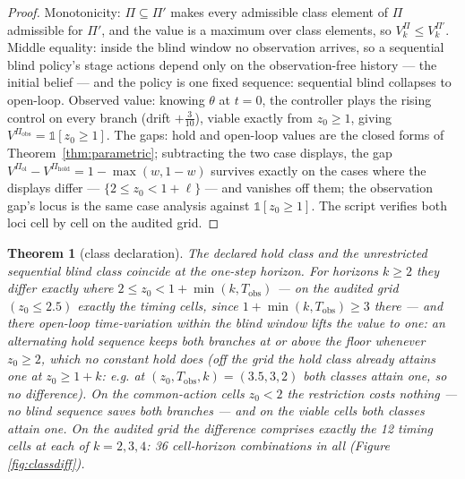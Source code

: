 \documentclass[10pt,twocolumn]{article}
\theoremstyle{plain}
\newtheorem{theorem}{Theorem}
\theoremstyle{definition}
\theoremstyle{remark}
\begin{document}
\begin{proof}
Monotonicity: \(\Pi \subseteq \Pi'\) makes every admissible class
element of \(\Pi\) admissible for \(\Pi'\), and the value is a
maximum over class elements, so
\(V^{\Pi}_{k} \le V^{\Pi'}_{k}\). Middle equality: inside the blind
window no observation arrives, so a sequential blind policy's stage
actions depend only on the observation-free history --- the initial
belief --- and the policy is one fixed sequence: sequential blind
collapses to open-loop. Observed value: knowing \(\theta\) at
\(t = 0\), the controller plays the rising control on every branch
(drift \(+\tfrac3{10}\)), viable exactly from \(z_{0} \ge 1\),
giving \(V^{\Pi_{\mathrm{obs}}} = \mathbb{1}[z_{0} \ge 1]\). The
gaps: hold and open-loop values are the closed forms of
Theorem~\ref{thm:parametric}; subtracting the two case displays, the gap
\(V^{\Pi_{\mathrm{ol}}} - V^{\Pi_{\mathrm{hold}}} = 1 - \max(w,
1 - w)\) survives exactly on the cases where the displays differ ---
\(\{2 \le z_{0} < 1 + \ell\}\) --- and vanishes off them; the
observation gap's locus is the same case analysis against
\(\mathbb{1}[z_{0} \ge 1]\). The script verifies both loci cell by
cell on the audited grid.
\end{proof}

\begin{theorem}[class declaration]\label{thm:class}
The declared hold class and the unrestricted sequential blind class
coincide at the one-step horizon. For horizons \(k \ge 2\) they differ
exactly where \(2 \le z_{0} < 1 + \min(k, T_{\mathrm{obs}})\) --- on
the audited grid \((z_{0} \le 2.5)\) exactly the timing cells, since
\(1 + \min(k, T_{\mathrm{obs}}) \ge 3\) there --- and there open-loop
time-variation within the blind window lifts the value to one: an
alternating hold sequence keeps both branches at or above the floor
whenever \(z_{0} \ge 2\), which no constant hold does (off the grid
the hold class already attains one at \(z_{0} \ge 1 + k\): e.g. at
\((z_{0}, T_{\mathrm{obs}}, k) = (3.5, 3, 2)\) both classes attain
one, so no difference). On the
common-action cells \(z_{0} < 2\) the restriction costs nothing --- no
blind sequence saves both branches --- and on the viable cells both
classes attain one. On the audited grid the difference comprises exactly
the 12 timing cells at each of \(k = 2, 3, 4\): 36 cell-horizon
combinations in all (Figure \ref{fig:classdiff}).
\end{theorem}
\end{document}
